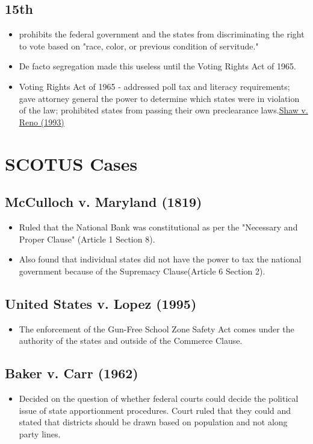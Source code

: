 \documentclass[12pt]{article}
\begin{document}
\subsection*{15th}
	\begin{itemize}
		\item prohibits the federal government and the states from discriminating the right to vote based on "race, color, or previous condition of servitude."
		\item De facto segregation made this useless until the Voting Rights Act of 1965.
		\item Voting Rights Act of 1965 - addressed poll tax and literacy requirements; gave attorney general the power to determine which states were in violation of the law; prohibited states from passing their own preclearance laws.\hyperlink{Shaw}{Shaw v. Reno (1993)}
	\end{itemize}

\section*{SCOTUS Cases}
\hypertarget{McCulloch}{\subsection*{McCulloch v. Maryland (1819)}}
	\begin{itemize}
	\item Ruled that the National Bank was constitutional as per the "Necessary and Proper Clause" (Article 1 Section 8).
	\item Also found that individual states did not have the power to tax the national government because of the Supremacy Clause(Article 6 Section 2).
	\end{itemize}

\hypertarget{Lopez}{\subsection*{United States v. Lopez (1995)}}
	\begin{itemize}
		\item The enforcement of the Gun-Free School Zone Safety Act comes under the authority of the states and outside of the Commerce Clause.
	\end{itemize}

\hypertarget{Baker}{\subsection*{Baker v. Carr (1962)}}
	\begin{itemize}
		\item Decided on the question of whether federal courts could decide the political issue of state apportionment procedures. Court ruled that they could and stated that districts should be drawn based on population and not along party lines.
	\end{itemize}
\end{document}
